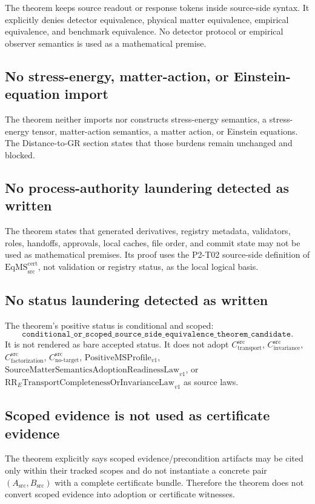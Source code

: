 \documentclass[11pt]{article}
\newcommand{\EqMS}{\mathrm{EqMS}_{\mathrm{src}}^{\mathrm{cert}}}
\newcommand{\CTr}{C_{\mathrm{transport}}^{\mathrm{src}}}
\newcommand{\CInv}{C_{\mathrm{invariance}}^{\mathrm{src}}}
\newcommand{\CFact}{C_{\mathrm{factorization}}^{\mathrm{src}}}
\newcommand{\CNTI}{C_{\mathrm{no\text{-}target}}^{\mathrm{src}}}
\begin{document}
The theorem keeps source readout or response tokens inside source-side syntax.
It explicitly denies detector equivalence, physical matter equivalence,
empirical equivalence, and benchmark equivalence. No detector protocol or
empirical observer semantics is used as a mathematical premise.

\subsection{No stress-energy, matter-action, or Einstein-equation import}

The theorem neither imports nor constructs stress-energy semantics, a
stress-energy tensor, matter-action semantics, a matter action, or Einstein
equations. The Distance-to-GR section states that those burdens remain
unchanged and blocked.

\subsection{No process-authority laundering detected as written}

The theorem states that generated derivatives, registry metadata, validators,
roles, handoffs, approvals, local caches, file order, and commit state may not
be used as mathematical premises. Its proof uses the P2-T02 source-side
definition of \(\EqMS\), not validation or registry status, as the local
logical basis.

\subsection{No status laundering detected as written}

The theorem's positive status is conditional and scoped:
\[
  \texttt{conditional\_or\_scoped\_source\_side\_equivalence\_theorem\_candidate}.
\]
It is not rendered as bare accepted status. It does not adopt
\(\CTr\), \(\CInv\), \(\CFact\), \(\CNTI\), \(\mathrm{PositiveMSProfile}_{v1}\),
\(\mathrm{SourceMatterSemanticsAdoptionReadinessLaw}_{v1}\), or
\(\mathrm{RR}_{E}\mathrm{TransportCompletenessOrInvarianceLaw}_{v1}\) as
source laws.

\subsection{Scoped evidence is not used as certificate evidence}

The theorem explicitly says scoped evidence/precondition artifacts may be
cited only within their tracked scopes and do not instantiate a concrete pair
\((A_{\mathrm{src}},B_{\mathrm{src}})\) with a complete certificate bundle.
Therefore the theorem does not convert scoped evidence into adoption or
certificate witnesses.
\end{document}
